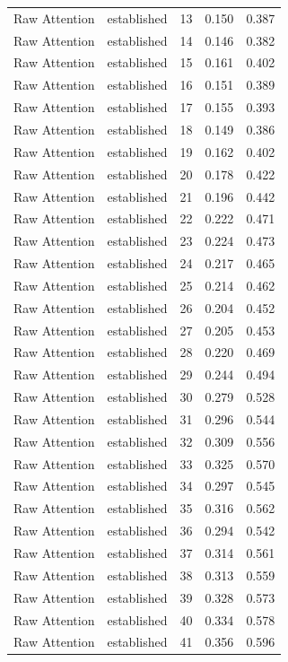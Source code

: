 \begin{tabular}{llrrr}
Raw Attention & established & 13 & 0.150 & 0.387 \\
Raw Attention & established & 14 & 0.146 & 0.382 \\
Raw Attention & established & 15 & 0.161 & 0.402 \\
Raw Attention & established & 16 & 0.151 & 0.389 \\
Raw Attention & established & 17 & 0.155 & 0.393 \\
Raw Attention & established & 18 & 0.149 & 0.386 \\
Raw Attention & established & 19 & 0.162 & 0.402 \\
Raw Attention & established & 20 & 0.178 & 0.422 \\
Raw Attention & established & 21 & 0.196 & 0.442 \\
Raw Attention & established & 22 & 0.222 & 0.471 \\
Raw Attention & established & 23 & 0.224 & 0.473 \\
Raw Attention & established & 24 & 0.217 & 0.465 \\
Raw Attention & established & 25 & 0.214 & 0.462 \\
Raw Attention & established & 26 & 0.204 & 0.452 \\
Raw Attention & established & 27 & 0.205 & 0.453 \\
Raw Attention & established & 28 & 0.220 & 0.469 \\
Raw Attention & established & 29 & 0.244 & 0.494 \\
Raw Attention & established & 30 & 0.279 & 0.528 \\
Raw Attention & established & 31 & 0.296 & 0.544 \\
Raw Attention & established & 32 & 0.309 & 0.556 \\
Raw Attention & established & 33 & 0.325 & 0.570 \\
Raw Attention & established & 34 & 0.297 & 0.545 \\
Raw Attention & established & 35 & 0.316 & 0.562 \\
Raw Attention & established & 36 & 0.294 & 0.542 \\
Raw Attention & established & 37 & 0.314 & 0.561 \\
Raw Attention & established & 38 & 0.313 & 0.559 \\
Raw Attention & established & 39 & 0.328 & 0.573 \\
Raw Attention & established & 40 & 0.334 & 0.578 \\
Raw Attention & established & 41 & 0.356 & 0.596 \\

\end{tabular}
